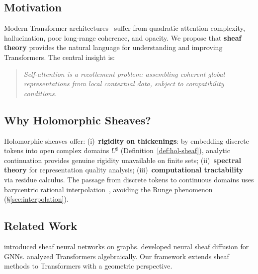 \documentclass[11pt,a4paper]{article}
\theoremstyle{plain}
\theoremstyle{definition}
\theoremstyle{remark}
\begin{document}
\subsection{Motivation}
Modern Transformer architectures~\citep{vaswani2017} suffer from quadratic attention complexity, hallucination, poor long-range coherence, and opacity. We propose that \textbf{sheaf theory} provides the natural language for understanding and improving Transformers. The central insight is:

\begin{quote}
\emph{Self-attention is a recollement problem: assembling coherent global representations from local contextual data, subject to compatibility conditions.}
\end{quote}

\subsection{Why Holomorphic Sheaves?}
Holomorphic sheaves offer: (i)~\textbf{rigidity on thickenings}: by embedding discrete tokens into open complex domains $U^\sharp$ (Definition~\ref{def:hol-sheaf}), analytic continuation provides genuine rigidity unavailable on finite sets; (ii)~\textbf{spectral theory} for representation quality analysis; (iii)~\textbf{computational tractability} via residue calculus. The passage from discrete tokens to continuous domains uses barycentric rational interpolation~\citep{berrut2004}, avoiding the Runge phenomenon (\S\ref{sec:interpolation}).

\subsection{Related Work}
\citet{hansen2020} introduced sheaf neural networks on graphs. \citet{bodnar2022} developed neural sheaf diffusion for GNNs. \citet{weiss2021} analyzed Transformers algebraically. Our framework extends sheaf methods to Transformers with a geometric perspective.
\end{document}
